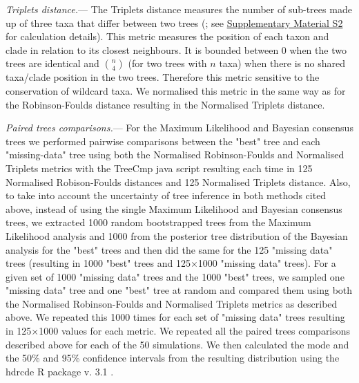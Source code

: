 \documentclass[12pt,letterpaper]{article}
\renewcommand{\subsubsection}[1]{%
\vspace{2ex}
\noindent
\textit{#1.}---}
\begin{document}
\subsubsection{Triplets distance}
The Triplets distance \citep{dobson1975triplets} measures the number of sub-trees made up of three taxa that differ between two trees (\citealt{critchlowthe1996}; see \hyperref[SupplementaryMaterial]{Supplementary Material S2} for calculation details). This metric measures the position of each taxon and clade in relation to its closest neighbours. It is bounded between 0 when the two trees are identical and $\binom{n}{4}$ (for two trees with $n$ taxa) when there is no shared taxa/clade position in the two trees. Therefore this metric sensitive to the conservation of wildcard taxa. We normalised this metric in the same way as for the Robinson-Foulds distance resulting in the Normalised Triplets distance.

\subsubsection{Paired trees comparisons}
\label{tree_comparisons}
For the Maximum Likelihood and Bayesian consensus trees we performed pairwise comparisons between the "best" tree and each "missing-data" tree using both the Normalised Robinson-Foulds and Normalised Triplets metrics with the TreeCmp java script \citep{Bogdanowicz2012} resulting each time in 125 Normalised Robison-Foulds distances and 125 Normalised Triplets distance. %
Also, to take into account the uncertainty of tree inference in both methods cited above, instead of using the single Maximum Likelihood and Bayesian consensus trees, we extracted 1000 random bootstrapped trees from the Maximum Likelihood analysis and 1000 from the posterior tree distribution of the Bayesian analysis for the "best" trees and then did the same for the 125 "missing data" trees (resulting in 1000 "best" trees and 125$\times$1000 "missing data" trees). 
For a given set of 1000 "missing data" trees and the 1000 "best" trees, we sampled one "missing data" tree and one "best" tree at random and compared them using both the Normalised Robinson-Foulds and Normalised Triplets metrics as described above. We repeated this 1000 times for each set of "missing data" trees resulting in 125$\times$1000 values for each metric. We repeated all the paired trees comparisons described above for each of the 50 simulations. We then calculated the mode and the 50\% and 95\% confidence intervals from the resulting distribution using the hdrcde R package v. 3.1 \citep{hdrcde}.
\end{document}
